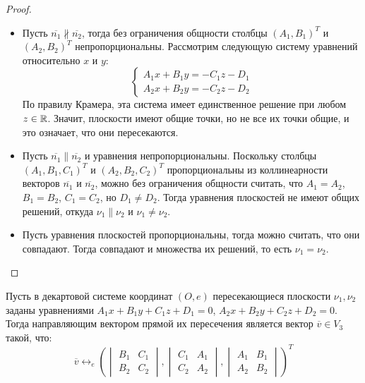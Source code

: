     \begin{proof}~
    	\begin{itemize}
    		\item Пусть $\overline{n_1} \nparallel \overline{n_2}$, тогда без ограничения общности столбцы $(A_1, B_1)^T$ и $(A_2, B_2)^T$ непропорциональны. Рассмотрим следующую систему уравнений относительно $x$ и $y$:
    		\[\left\{
    		\begin{aligned}
    		A_1x + B_1y = -C_1z -D_1\\
    		A_2x + B_2y = -C_2z -D_2
    		\end{aligned}
    		\right.
    		\]
    		По правилу Крамера, эта система имеет единственное решение при любом $z \in \mathbb{R}$. Значит, плоскости имеют общие точки, но не все их точки общие, и это означает, что они пересекаются.
    		
    		\item Пусть $\overline{n_1} \parallel \overline{n_2}$ и уравнения непропорциональны. Поскольку столбцы $(A_1, B_1, C_1)^T$ и $(A_2, B_2, C_2)^T$ пропорциональны из коллинеарности векторов $\overline{n_1}$ и $\overline{n_2}$, можно без ограничения общности считать, что $A_1 = A_2$, $B_1 = B_2$, $C_1 = C_2$, но $D_1 \ne D_2$. Тогда уравнения плоскостей не имеют общих решений, откуда $\nu_1 \parallel \nu_2 \text{ и } \nu_1 \ne \nu_2$.
    		
    		\item Пусть уравнения плоскостей пропорциональны, тогда можно считать, что они совпадают. Тогда совпадают и множества их решений, то есть $\nu_1 = \nu_2$.\qedhere
    	\end{itemize}
    \end{proof}
    
    \begin{proposition}
    	Пусть в декартовой системе координат $(O, e)$ пересекающиеся плоскости $\nu_1, \nu_2$ заданы уравнениями $A_1x+B_1y+C_1z+D_1 = 0$, $A_2x+B_2y+C_2z+D_2 = 0$. Тогда направляющим вектором прямой их пересечения является вектор $\overline v \in V_3$ такой, что:
    	\[\overline{v} \leftrightarrow_{e} \left(
    	\begin{vmatrix}
    	B_1&C_1\\
    	B_2&C_2
    	\end{vmatrix}, \begin{vmatrix}
    	C_1&A_1\\
    	C_2&A_2
    	\end{vmatrix}, \begin{vmatrix}
    	A_1&B_1\\
    	A_2&B_2
    	\end{vmatrix}\right)^T\]
    \end{proposition}
    

